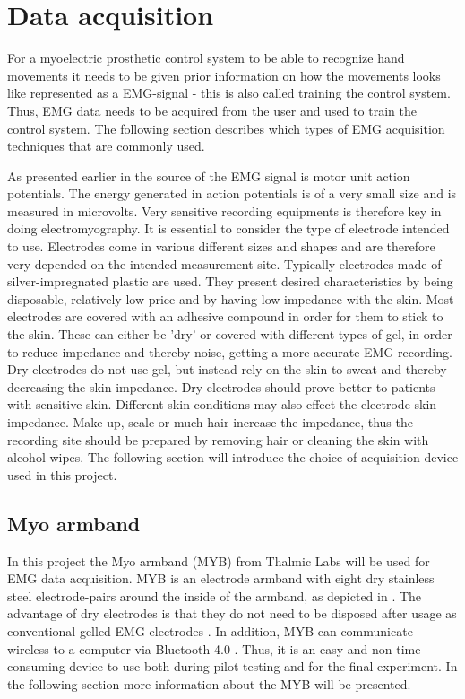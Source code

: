 \section{Data acquisition} \label{sec:MYB}
For a myoelectric prosthetic control system to be able to recognize hand movements it needs to be given prior information on how the movements looks like represented as a EMG-signal - this is also called training the control system. Thus, EMG data needs to be acquired from the user and used to train the control system. The following section describes which types of EMG acquisition techniques that are commonly used.

As presented earlier in  the source of the EMG signal is motor unit action potentials. The energy generated in action potentials is of a very small size and is measured in microvolts. Very sensitive recording equipments is therefore key in doing electromyography. It is essential to consider the type of electrode intended to use. Electrodes come in various different sizes and shapes and are therefore very depended on the intended measurement site. Typically electrodes made of silver-impregnated plastic are used. They present desired characteristics by being disposable, relatively low price and by having low impedance with the skin. Most electrodes are covered with an adhesive compound in order for them to stick to the skin. These can either be 'dry' or covered with different types of gel, in order to reduce impedance and thereby noise, getting a more accurate EMG recording. Dry electrodes do not use gel, but instead rely on the skin to sweat and thereby decreasing the skin impedance. Dry electrodes should prove better to patients with sensitive skin. Different skin conditions may also effect the electrode-skin impedance. Make-up, scale or much hair increase the impedance, thus the recording site should be prepared by removing hair or cleaning the skin with alcohol wipes. \cite{Cram2012} The following section will introduce the choice of acquisition device used in this project.

\subsection{Myo armband}
In this project the Myo armband (MYB) from Thalmic Labs will be used for EMG data acquisition. MYB is an electrode armband with eight dry stainless steel electrode-pairs around the inside of the armband, as depicted in . The advantage of dry electrodes is that they do not need to be disposed after usage as conventional gelled EMG-electrodes \cite{Cram2012}. In addition, MYB can communicate wireless to a computer via Bluetooth 4.0 \cite{Myoarmband2013}. Thus, it is an easy and non-time-consuming device to use both during pilot-testing and for the final experiment. In the following section more information about the MYB will be presented.


